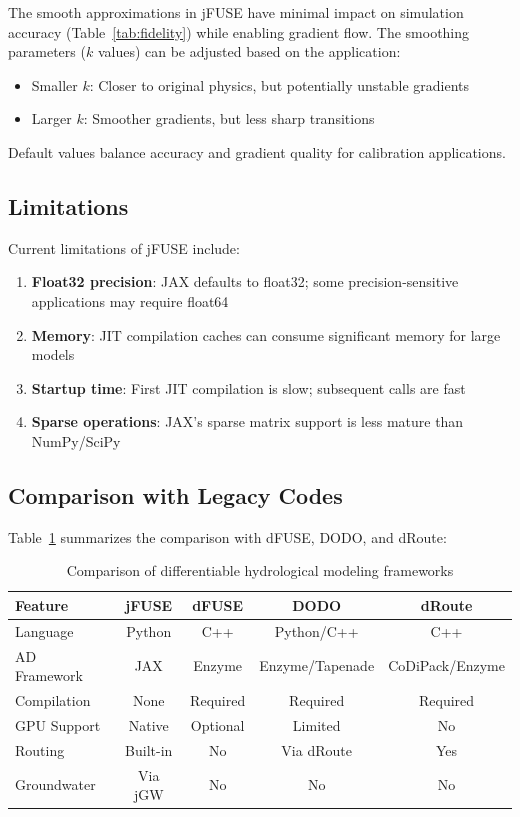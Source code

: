 \documentclass[11pt,a4paper]{article}
\begin{document}
The smooth approximations in jFUSE have minimal impact on simulation accuracy (Table~\ref{tab:fidelity}) while enabling gradient flow. The smoothing parameters ($k$ values) can be adjusted based on the application:
\begin{itemize}
    \item Smaller $k$: Closer to original physics, but potentially unstable gradients
    \item Larger $k$: Smoother gradients, but less sharp transitions
\end{itemize}

Default values balance accuracy and gradient quality for calibration applications.

\subsection{Limitations}

Current limitations of jFUSE include:

\begin{enumerate}
    \item \textbf{Float32 precision}: JAX defaults to float32; some precision-sensitive applications may require float64
    \item \textbf{Memory}: JIT compilation caches can consume significant memory for large models
    \item \textbf{Startup time}: First JIT compilation is slow; subsequent calls are fast
    \item \textbf{Sparse operations}: JAX's sparse matrix support is less mature than NumPy/SciPy
\end{enumerate}

\subsection{Comparison with Legacy Codes}

Table~\ref{tab:comparison} summarizes the comparison with dFUSE, DODO, and dRoute:

\begin{table}[h]
\centering
\caption{Comparison of differentiable hydrological modeling frameworks}
\label{tab:comparison}
\begin{tabular}{lcccc}
\toprule
Feature & jFUSE & dFUSE & DODO & dRoute \\
\midrule
Language & Python & C++ & Python/C++ & C++ \\
AD Framework & JAX & Enzyme & Enzyme/Tapenade & CoDiPack/Enzyme \\
Compilation & None & Required & Required & Required \\
GPU Support & Native & Optional & Limited & No \\
Routing & Built-in & No & Via dRoute & Yes \\
Groundwater & Via jGW & No & No & No \\
\bottomrule
\end{tabular}
\end{table}
\end{document}
